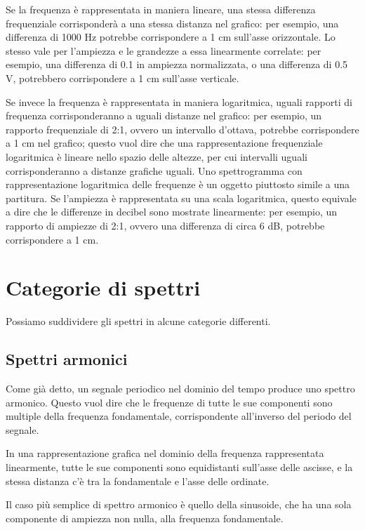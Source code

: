 Se la frequenza è rappresentata in maniera lineare, una stessa differenza frequenziale corrisponderà a una stessa distanza nel grafico: per esempio, una differenza di 1000 Hz potrebbe corrispondere a 1 cm sull'asse orizzontale. Lo stesso vale per l'ampiezza e le grandezze a essa linearmente correlate: per esempio, una differenza di 0.1 in ampiezza normalizzata, o una differenza di 0.5 V, potrebbero corrispondere a 1 cm sull'asse verticale. 

Se invece la frequenza è rappresentata in maniera logaritmica, uguali rapporti di frequenza corrisponderanno a uguali distanze nel grafico: per esempio, un rapporto frequenziale di 2:1, ovvero un intervallo d'ottava, potrebbe corrispondere a 1 cm nel grafico; questo vuol dire che una rappresentazione frequenziale logaritmica è lineare nello spazio delle altezze, per cui intervalli uguali corrisponderanno a distanze grafiche uguali. Uno spettrogramma con rappresentazione logaritmica delle frequenze è un oggetto piuttosto simile a una partitura. Se l'ampiezza è rappresentata su una scala logaritmica, questo equivale a dire che le differenze in decibel sono mostrate linearmente: per esempio, un rapporto di ampiezze di 2:1, ovvero una differenza di circa 6 dB, potrebbe corrispondere a 1 cm. 





\section{Categorie di spettri}

Possiamo suddividere gli spettri in alcune categorie differenti. 


\subsection{Spettri armonici}

Come già detto, un segnale periodico nel dominio del tempo produce uno spettro armonico. Questo vuol dire che le frequenze di tutte le sue componenti sono multiple della frequenza fondamentale, corrispondente all'inverso del periodo del segnale.

In una rappresentazione grafica nel dominio della frequenza rappresentata linearmente, tutte le sue componenti sono equidistanti sull'asse delle ascisse, e la stessa distanza c'è tra la fondamentale e l'asse delle ordinate.

Il caso più semplice di spettro armonico è quello della sinusoide, che ha una sola componente di ampiezza non nulla, alla frequenza fondamentale.

